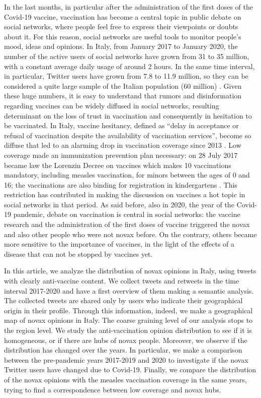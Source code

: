 \documentclass[prb,twocolumn,9pt]{revtex4-1}
\begin{document}
In the last months, in particular after the administration of the first doses of the Covid-19 vaccine, vaccination has become a central topic in public debate on social networks, where people feel free to express their viewpoints or doubts about it. For this reason, social networks are useful tools to monitor people's mood, ideas and opinions. In Italy, from January 2017 to January 2020, the number of the active users of social networks have grown from 31 to 35 million, with a constant average daily usage of around 2 hours. In the same time interval, in particular, Twitter users have grown from 7.8 to 11.9 million, so they can be considered a quite large sample of the Italian population (60 million) \cite{Users}.
Given these huge numbers, it is easy to understand that rumors and disinformation regarding vaccines can be widely diffused in social networks, resulting determinant on the loss of trust in vaccination and consequently in hesitation to be vaccinated. In Italy, vaccine hesitancy, defined as “delay in acceptance or refusal of vaccination despite the availability of vaccination services”, become so diffuse that led to an alarming drop in vaccination coverage since 2013 \cite{twitter_sentinel}. Low coverage made an immunization prevention plan necessary: on 28 July 2017 became law the Lorenzin Decree on vaccines which makes 10 vaccinations mandatory, including measles vaccination, for minors between the ages of 0 and 16; the vaccinations are also binding for registration in kindergartens \cite{ministerosalute}. This restriction has contributed in making the discussion on vaccines a hot topic in social networks in that period.
As said before, also in 2020, the year of the Covid-19 pandemic, debate on vaccination is central in social networks: the vaccine research and the administration of the first doses of vaccine triggered the novax and also other people who were not novax before. On the contrary, others became more sensitive to the importance of vaccines, in the light of the effects of a disease that can not be stopped by vaccines yet.

In this article, we analyze the distribution of novax opinions in Italy, using tweets with clearly anti-vaccine content. We collect tweets and retweets in the time interval 2017-2020 and have a first overview of them making a semantic analysis. The collected tweets are shared only by users who indicate their geographical origin in their profile. Through this information, indeed, we make a geographical map of novax opinions in Italy. The coarse graining level of our analysis stops to the region level. We study the anti-vaccination opinion distribution to see if it is homogeneous, or if there are hubs of novax people. Moreover, we observe if the distribution has changed over the years. In particular, we make a comparison between the pre-pandemic years 2017-2019 and 2020 to investigate if the novax Twitter users have changed due to Covid-19.
Finally, we compare the distribution of the novax opinions with the measles vaccination coverage in the same years, trying to find a correspondence between low coverage and novax hubs. 
\end{document}
